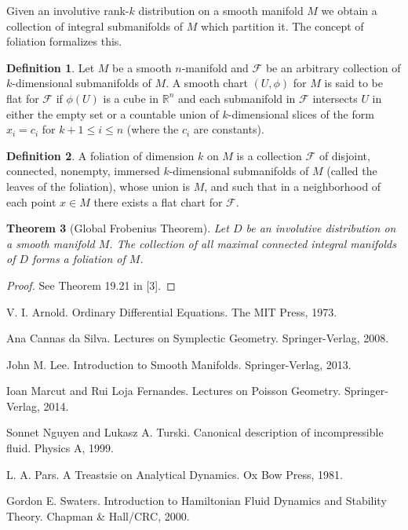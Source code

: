\documentclass[psamsfonts,12pt]{amsart}
\newcommand\0{\mathbf{0}}
\theoremstyle{plain}
\newtheorem{thm}{Theorem}[section] %
\theoremstyle{definition}
\newtheorem{dfn}[thm]{Definition} %
\newcommand{\bbR}{\mathbb{R}}
\newcommand{\sF}{\mathcal{F}}
\begin{document}
Given an involutive rank-$k$ distribution on a smooth manifold $M$ we obtain a collection of integral submanifolds of $M$ which partition it.  The concept of foliation formalizes this.

\begin{dfn}
Let $M$ be a smooth $n$-manifold and $\sF$ be an arbitrary collection of $k$-dimensional submanifolds of $M$.  A smooth chart $(U,\phi)$ for $M$ is said to be flat for $\sF$ if $\phi(U)$ is a cube in $\bbR^n$ and each submanifold in $\sF$ intersects $U$ in either the empty set or a countable union of $k$-dimensional slices of the form $x_i=c_i$ for $k+1\leq i\leq n$ (where the $c_i$ are constants).
\end{dfn}

\begin{dfn}
A foliation of dimension $k$ on $M$ is a collection $\sF$ of disjoint, connected, nonempty, immersed $k$-dimensional submanifolds of $M$ (called the leaves of the foliation), whose union is $M$, and such that in a neighborhood of each point $x\in M$ there exists a flat chart for $\sF$.
\end{dfn}

\begin{thm}[Global Frobenius Theorem]
Let $D$ be an involutive distribution on a smooth manifold $M$.  The collection of all maximal connected integral manifolds of $D$ forms a foliation of $M$.
\end{thm}
\begin{proof}
See Theorem 19.21 in [3].
\end{proof}






\begin{thebibliography}{9}

V. I. Arnold.
Ordinary Differential Equations.
The MIT Press, 1973.

Ana Cannas da Silva.
Lectures on Symplectic Geometry.
Springer-Verlag, 2008.

John M. Lee.
Introduction to Smooth Manifolds.
Springer-Verlag, 2013.

Ioan Marcut and Rui Loja Fernandes.
Lectures on Poisson Geometry.
Springer-Verlag, 2014.

Sonnet Nguyen and Lukasz A. Turski.
Canonical description of incompressible fluid.
Physics A, 1999.

L. A. Pars.
A Treastsie on Analytical Dynamics.
Ox Bow Press, 1981.

Gordon E. Swaters.
Introduction to Hamiltonian Fluid Dynamics and Stability Theory.
Chapman \& Hall/CRC, 2000.


\end{thebibliography}
\end{document}
